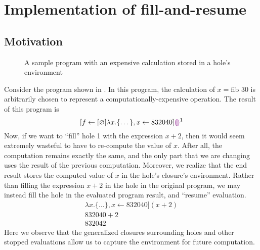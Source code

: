 \chapter{Implementation of fill-and-resume}
\label{sec:far_impl}




\section{Motivation}
\label{sec:far-motivation}

\begin{figure}
  \centering
  \caption{A sample program with an expensive calculation stored in a hole's environment}
  \label{fig:far-motivation}
\end{figure}

Consider the program shown in . In this program, the calculation of $x=\text{fib }30$ is arbitrarily chosen to represent a computationally-expensive operation. The result of this program is \[
  [f\leftarrow [\varnothing]\lambda x.\{\dots\},x\leftarrow 832040]\textcolor{violet}{\llparenthesis}\textcolor{violet}{\rrparenthesis}^1
\]
Now, if we want to ``fill'' hole 1 with the expression $x+2$, then it would seem extremely wasteful to have to re-compute the value of $x$. After all, the computation remains exactly the same, and the only part that we are changing uses the result of the previous computation. Moreover, we realize that the end result stores the computed value of $x$ in the hole's closure's environment. Rather than filling the expression $x+2$ in the hole in the original program, we may instead fill the hole in the evaluated program result, and ``resume'' evaluation.
\begin{gather*}
  [f\leftarrow [\varnothing]\lambda x.\{\dots\},x\leftarrow 832040](x+2) \\
  832040+2 \\
  832042
\end{gather*}
Here we observe that the generalized closures surrounding holes and other stopped evaluations allow us to capture the environment for future computation.

